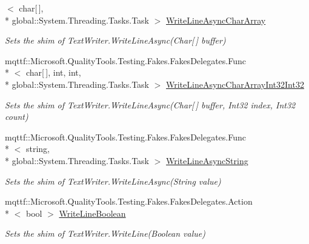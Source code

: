 \begin{DoxyCompactItemize}
$<$ char\mbox{[}$\,$\mbox{]}, \\*
global\-::\-System.\-Threading.\-Tasks.\-Task $>$ \hyperlink{class_system_1_1_i_o_1_1_fakes_1_1_shim_text_writer_a3fcbdbadef8c43dc2823d479df07d075}{Write\-Line\-Async\-Char\-Array}
\begin{DoxyCompactList}\small\item\em Sets the shim of Text\-Writer.\-Write\-Line\-Async(\-Char\mbox{[}$\,$\mbox{]} buffer)\end{DoxyCompactList}\item 
mqttf\-::\-Microsoft.\-Quality\-Tools.\-Testing.\-Fakes.\-Fakes\-Delegates.\-Func\\*
$<$ char\mbox{[}$\,$\mbox{]}, int, int, \\*
global\-::\-System.\-Threading.\-Tasks.\-Task $>$ \hyperlink{class_system_1_1_i_o_1_1_fakes_1_1_shim_text_writer_a50f6c3930f352648a5c07ef30f7354d6}{Write\-Line\-Async\-Char\-Array\-Int32\-Int32}
\begin{DoxyCompactList}\small\item\em Sets the shim of Text\-Writer.\-Write\-Line\-Async(\-Char\mbox{[}$\,$\mbox{]} buffer, Int32 index, Int32 count)\end{DoxyCompactList}\item 
mqttf\-::\-Microsoft.\-Quality\-Tools.\-Testing.\-Fakes.\-Fakes\-Delegates.\-Func\\*
$<$ string, \\*
global\-::\-System.\-Threading.\-Tasks.\-Task $>$ \hyperlink{class_system_1_1_i_o_1_1_fakes_1_1_shim_text_writer_a182a57b6d52f8efeabd6879ccf35b156}{Write\-Line\-Async\-String}
\begin{DoxyCompactList}\small\item\em Sets the shim of Text\-Writer.\-Write\-Line\-Async(\-String value)\end{DoxyCompactList}\item 
mqttf\-::\-Microsoft.\-Quality\-Tools.\-Testing.\-Fakes.\-Fakes\-Delegates.\-Action\\*
$<$ bool $>$ \hyperlink{class_system_1_1_i_o_1_1_fakes_1_1_shim_text_writer_a855a07d5ce542fc5f53ff4ec503994dc}{Write\-Line\-Boolean}
\begin{DoxyCompactList}\small\item\em Sets the shim of Text\-Writer.\-Write\-Line(\-Boolean value)\end{DoxyCompactList}\item 

\end{DoxyCompactItemize}
